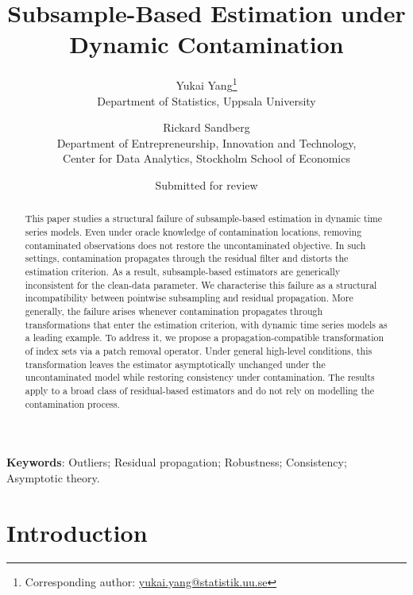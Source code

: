 \documentclass[12pt]{article}
\title{\sffamily Subsample-Based Estimation under \\ Dynamic Contamination}
\date{Submitted for review}
\author{
\sffamily Yukai Yang\orcidlink{0000-0002-2623-8549}\thanks{Corresponding author: \href{mailto:yukai.yang@statistik.uu.se}{yukai.yang@statistik.uu.se}}
\\
\small Department of Statistics, Uppsala University
\and
\sffamily Rickard Sandberg\orcidlink{0000-0003-0589-4034}
\\
\small Department of Entrepreneurship, Innovation and Technology, \\
\small Center for Data Analytics, Stockholm School of Economics
}
\date{}
\numberwithin{equation}{section}
\begin{document}

\maketitle

\begin{abstract}
This paper studies a structural failure of subsample-based estimation in dynamic time series models. Even under oracle knowledge of contamination locations, removing contaminated observations does not restore the uncontaminated objective. In such settings, contamination propagates through the residual filter and distorts the estimation criterion. As a result, subsample-based estimators are generically inconsistent for the clean-data parameter. We characterise this failure as a structural incompatibility between pointwise subsampling and residual propagation. More generally, the failure arises whenever contamination propagates through transformations that enter the estimation criterion, with dynamic time series models as a leading example. To address it, we propose a propagation-compatible transformation of index sets via a patch removal operator. Under general high-level conditions, this transformation leaves the estimator asymptotically unchanged under the uncontaminated model while restoring consistency under contamination. The results apply to a broad class of residual-based estimators and do not rely on modelling the contamination process.
\end{abstract}

\noindent \textbf{Keywords}: Outliers; Residual propagation; Robustness; Consistency; Asymptotic theory.



\section{Introduction}\label{sec:introduction}
\end{document}
